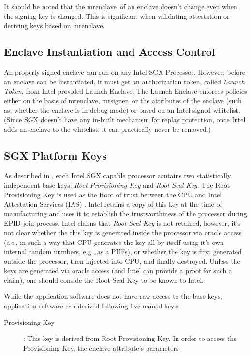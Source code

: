 \documentclass[11pt]{article}
\newcommand{\ie}{\textit{i.e.}}
\newcommand{\mrenclave}{\textsf{mrenclave}}
\newcommand{\mrsigner}{\textsf{mrsigner}}
\begin{document}
  It should be noted that the \mrenclave\ of an enclave doesn't
  change even when the signing key is changed. This is significant
  when validating attestation or deriving keys based on
  \mrenclave.

  \subsection{Enclave Instantiation and Access Control}
  An properly signed enclave can run on any Intel SGX
  Processor. However, before an enclave can be instantiated, it must
  get an authorization token, called \textit{Launch Token}, from Intel
  provided \textsf{Launch Enclave}. The \textsf{Launch Enclave}
  enforces policies either on the basis of \mrenclave, \mrsigner, or
  the attributes of the enclave (such as, whether the enclave is in
  debug mode) or based on an Intel signed whitelist. (Since SGX
  doesn't have any in-built mechanism for replay protection, once
  Intel adds an enclave to the whitelist, it can practically never be
  removed.)

  \subsection{SGX Platform Keys}
  As described in \cite{sgxattest}, each Intel SGX capable processor
  contains two statistically independent base keys:
  \textit{Root Provisioning Key} and \textit{Root Seal Key}. The Root
  Provisioning Key is used as the Root of trust between the CPU and
  Intel Attestation Services (IAS) \cite{ias}. Intel retains a copy
  of this key at the time of manufacturing and uses it to establish
  the trustworthiness of the processor during EPID join process. Intel
  claims that \textit{Root Seal Key} is not retained, however, it's
  not clear whether the this key is generated inside the processor via
  oracle access (\ie, in such a way that CPU generates the key all by
  itself using it's own internal random numbers, e.g., as a PUFs), or
  whether the key is first generated outside the processor, then
  injected into CPU, and finally destroyed. Unless the keys are
  generated via oracle access (and Intel can provide a proof for such
  a claim), one should conside the Root Seal Key to be known to Intel.

  While the application software does not have raw access to the base
  keys, application software can derived following five named keys:

  \begin{description}
    \item[Provisioning Key]: This key is derived from Root
      Provisioning Key. In order to access the Provisioning Key, the
      enclave attribute's parameters
  \end{description}
\end{document}
